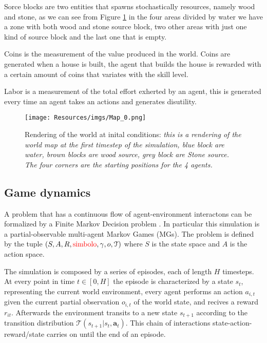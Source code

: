 Sorce blocks are two entities that spawns stochastically resources, namely wood and stone, as we can see from Figure \ref{img:map_0} in the four areas divided by water we have a zone with both wood and stone source block, two other areas with just one kind of source block and the last one that is empty. 

Coins is the measurement of the value produced in the world. Coins are generated when a house is built, the agent that builds the house is rewarded with a certain amount of coins that variates with the skill level.

Labor is a measurement of the total effort exherted by an agent, this is generated every time an agent takes an actions and generates disutility.


\begin{figure}[h!]
    \centering
    \linespread{.9} 
    \texttt{[image: Resources/imgs/Map\_0.png]}
    \caption[Rendering of the world at inital conditions: ]%
    {\label{img:map_0}Rendering of the world at inital conditions: \small \textit{this is a rendering of the world map at the first timestep of the simulation, blue block are water, brown blocks are wood source, grey block are Stone source. The four corners are the starting positions for the 4 agents.}}
\end{figure}



\subsection{Game dynamics}

A problem that has a continuous flow of agent-environment interactons can be formalized by a Finite Markov Decision problem \cite{sutton2018reinforcement}. In particular this simulation is a partial-observable multi-agent Markov Games (MGs). The problem is defined by the tuple \(\left(  S,A,R, \text{\textcolor{red}{simbolo}} ,\gamma, o, \mathcal{T} \right) \) where \( S \) is the state space and \( A \) is the action space. 

The simulation is composed by a series of episodes, each of length \( H \) timesteps. At every point in time \( t \in [0,H] \) the episode is characterized by a state \( s_t \), representing the current world environment, every agent performs an action \( a_{i,t}  \)  given the current partial observation \( o_{i,t}\) of the world state, and recives a reward \( r_{it}  \). Afterwards the environment transits to a new state \( s_{t+1} \) according to the transition distribution \(  \mathcal{T}(s_{t+1}|s_t,\boldsymbol{a}_t)\). This chain of interactions state-action-reward/state carries on until the end of an episode.

